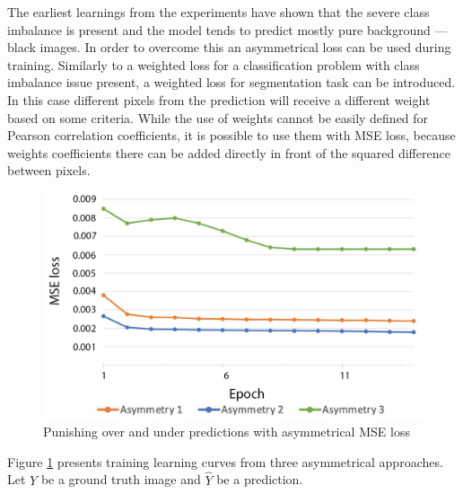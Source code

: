 The earliest learnings from the experiments have shown that the severe class imbalance is present and the model tends to predict mostly pure background --- black images. In order to overcome this an asymmetrical loss can be used during training. Similarly to a weighted loss for a classification problem with class imbalance issue present, a weighted loss for segmentation task can be introduced. In this case different pixels from the prediction will receive a different weight based on some criteria. While the use of weights cannot be easily defined for Pearson correlation coefficients, it is possible to use them with MSE loss, because weights coefficients there can be added directly in front of the squared difference between pixels. 
\begin{figure}[H]
	\begin{center}
		\includegraphics[width=0.5\linewidth]{bilder/golgi/asymmetrical-training.png}
		\caption{Punishing over and under predictions with asymmetrical MSE loss}\label{fig:golgi-asymmetrical-training}
	\end{center}
\end{figure}

Figure \ref{fig:golgi-asymmetrical-training} presents training learning curves from three asymmetrical approaches. Let $Y$ be a ground truth image and $\hat{Y}$ be a prediction.

